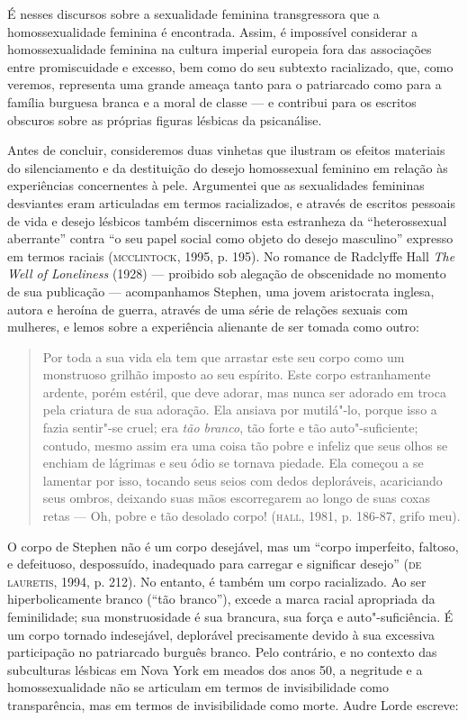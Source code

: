 É nesses discursos sobre a sexualidade feminina transgressora que a
homossexualidade feminina é encontrada. Assim, é impossível considerar a
homossexualidade feminina na cultura imperial europeia fora das
associações entre promiscuidade e excesso, bem como do seu subtexto
racializado, que, como veremos, representa uma grande ameaça tanto para
o patriarcado como para a família burguesa branca e a moral de classe ---
e contribui para os escritos obscuros sobre as próprias figuras lésbicas
da psicanálise.

Antes de concluir, consideremos duas vinhetas que ilustram os efeitos
materiais do silenciamento e da destituição do desejo homossexual
feminino em relação às experiências concernentes à pele. Argumentei que
as sexualidades femininas desviantes eram articuladas em termos
racializados, e através de escritos pessoais de vida e desejo lésbicos
também discernimos esta estranheza da ``heterossexual aberrante'' contra
``o seu papel social como objeto do desejo masculino'' expresso em termos
raciais (\textsc{mcclintock}, 1995, p. 195). No romance de Radclyffe Hall \emph{The
Well of Loneliness} (1928) --- proibido sob alegação de obscenidade no
momento de sua publicação --- acompanhamos Stephen, uma jovem aristocrata
inglesa, autora e heroína de guerra, através de uma série de relações
sexuais com mulheres, e lemos sobre a experiência alienante de ser
tomada como outro:

\begin{quote}
Por toda a sua vida ela tem que arrastar este seu corpo como um
monstruoso grilhão imposto ao seu espírito. Este corpo estranhamente
ardente, porém estéril, que deve adorar, mas nunca ser adorado em troca
pela criatura de sua adoração. Ela ansiava por mutilá"-lo, porque isso a
fazia sentir"-se cruel; era \emph{tão branco}, tão forte e tão
auto"-suficiente; contudo, mesmo assim era uma coisa tão pobre e infeliz
que seus olhos se enchiam de lágrimas e seu ódio se tornava piedade. Ela
começou a se lamentar por isso, tocando seus seios com dedos
deploráveis, acariciando seus ombros, deixando suas mãos escorregarem ao
longo de suas coxas retas --- Oh, pobre e tão desolado corpo! (\textsc{hall}, 1981,
p. 186-87, grifo meu).
\end{quote}

O corpo de Stephen não é um corpo desejável, mas um ``corpo imperfeito,
faltoso, e defeituoso, despossuído, inadequado para carregar e
significar desejo'' (\textsc{de lauretis}, 1994, p. 212). No entanto, é também um
corpo racializado. Ao ser hiperbolicamente branco (``tão branco''), excede
a marca racial apropriada da feminilidade; sua monstruosidade é sua
brancura, sua força e auto"-suficiência. É um corpo tornado indesejável,
deplorável precisamente devido à sua excessiva participação no
patriarcado burguês branco. Pelo contrário, e no contexto das
subculturas lésbicas em Nova York em meados dos anos 50, a negritude e
a homossexualidade não se articulam em termos de invisibilidade como
transparência, mas em termos de invisibilidade como morte. Audre Lorde
escreve:

